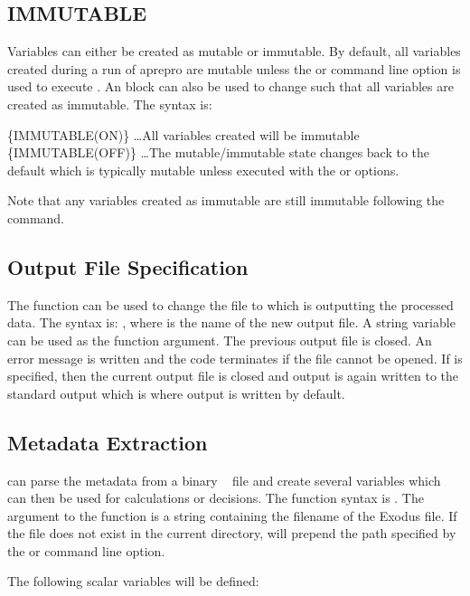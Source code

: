\subsection{IMMUTABLE}\label{immutable_block} Variables can either be
created as mutable or immutable.  By default, all variables created
during a run of aprepro are mutable unless the  or
 command line option is used to execute \aprepro{}.  An
 block can also be used to change \aprepro{} such that
all variables are created as immutable.  The syntax is:
\begin{apinp}
\{IMMUTABLE(ON)\}
\ldots All variables created will be immutable
\{IMMUTABLE(OFF)\}
\ldots The mutable/immutable state changes back to the default which
is typically mutable unless \aprepro{} executed with the
 or  options.
\end{apinp}
Note that any variables created as immutable are still immutable
following the  command.

\subsection{Output File Specification} The  function can be used
to change the file to which \aprepro{} is outputting the processed
data.  The syntax is: , where
 is the name of the new output file. A string variable
can be used as the function argument. The previous output file is
closed. An error message is written and the code terminates if the
file cannot be opened. If  is specified,
then the current output file is closed and output is again written to
the standard output which is where output is written by default.

\subsection{\exo{} Metadata Extraction} \aprepro{} can parse the
metadata from a binary \exo{}~\cite{exodus} file and create several
variables which can then be used for calculations or decisions.  The
function syntax is . The
argument to the function is a string containing the filename of the
Exodus file.  If the file does not exist in the current directory,
\aprepro{} will prepend the path specified by the  or
 command line option.

The following scalar variables will be defined:

